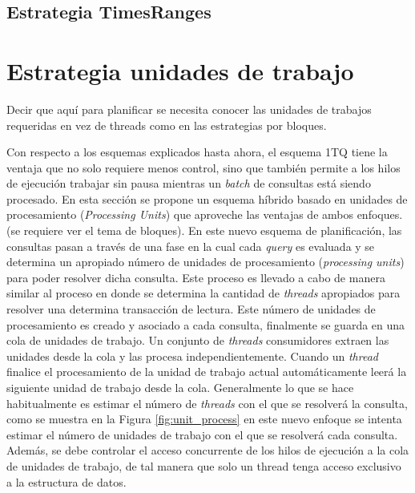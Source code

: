 \subsection{Estrategia TimesRanges}
\label{scheduling:fr}


\section{Estrategia unidades de trabajo}
\label{scheduling:unidadestrabajo}
Decir que aquí para planificar se necesita conocer las unidades de trabajos requeridas en vez de threads como en las estrategias por bloques.

Con respecto a los esquemas explicados hasta ahora, el esquema 1TQ tiene la ventaja que no solo requiere menos control, sino que también permite a los hilos de ejecución trabajar sin pausa mientras un \textit{batch} de consultas está siendo procesado. En esta sección se propone un esquema híbrido basado en unidades de procesamiento (\textit{Processing Units}) que aproveche las ventajas de ambos enfoques. (se requiere ver el tema de bloques).
En este nuevo esquema de planificación, las consultas pasan a través de una fase en la cual cada \textit{query} es evaluada y se determina un apropiado número de unidades de procesamiento (\textit{processing units}) para poder resolver dicha consulta. Este proceso es llevado a cabo de manera similar al proceso en donde se determina la cantidad de \textit{threads} apropiados para resolver una determina transacción de lectura. Este número de unidades de procesamiento es creado y asociado a cada consulta, finalmente se guarda en una cola de unidades de trabajo. Un conjunto de \textit{threads} consumidores extraen las unidades desde la cola y las procesa independientemente. Cuando un \textit{thread} finalice el procesamiento de la unidad de trabajo actual automáticamente leerá la siguiente unidad de trabajo desde la cola. 
Generalmente lo que se hace habitualmente es estimar el número de \textit{threads} con el que se resolverá la consulta, como se muestra en la Figura \ref{fig:unit_process} en este nuevo enfoque se intenta estimar el número de unidades de trabajo con el que se resolverá cada consulta. Además, se debe controlar el acceso concurrente de los hilos de ejecución a la cola de unidades de trabajo, de tal manera que solo un thread tenga acceso exclusivo a la estructura de datos. 

